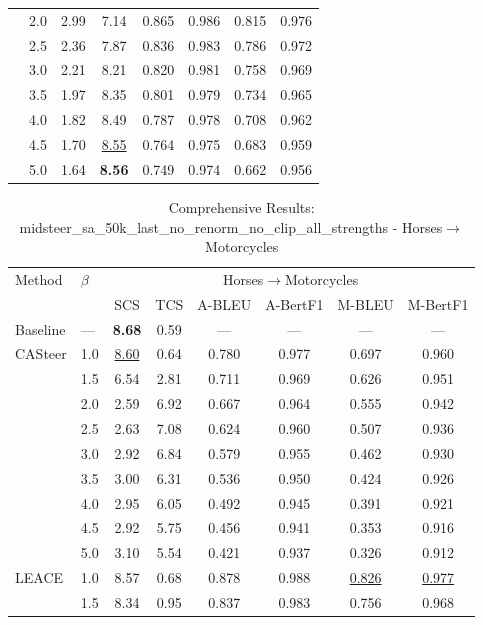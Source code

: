 \begin{table}[htbp]
\begin{tabular}{l|l|cccccc|}
 & 2.0 & 2.99 & 7.14 & 0.865 & 0.986 & 0.815 & 0.976 \\
 & 2.5 & 2.36 & 7.87 & 0.836 & 0.983 & 0.786 & 0.972 \\
 & 3.0 & 2.21 & 8.21 & 0.820 & 0.981 & 0.758 & 0.969 \\
 & 3.5 & 1.97 & 8.35 & 0.801 & 0.979 & 0.734 & 0.965 \\
 & 4.0 & 1.82 & 8.49 & 0.787 & 0.978 & 0.708 & 0.962 \\
 & 4.5 & 1.70 & \underline{8.55} & 0.764 & 0.975 & 0.683 & 0.959 \\
 & 5.0 & 1.64 & \textbf{8.56} & 0.749 & 0.974 & 0.662 & 0.956 \\
\hline
\end{tabular}
\end{table}

\begin{table}[htbp]
\centering
\caption{Comprehensive Results: midsteer\_sa\_50k\_last\_no\_renorm\_no\_clip\_all\_strengths - Horses$\rightarrow$Motorcycles}
\label{tab:midsteersa50klastnorenormnoclipallstrengths_horsestomotorcycles}
\begin{tabular}{l|l|cccccc|}
\hline
Method & $\beta$ & \multicolumn{6}{c|}{Horses$\rightarrow$Motorcycles} \\
 &  & SCS & TCS & A-BLEU & A-BertF1 & M-BLEU & M-BertF1 \\
\hline
Baseline & — & \textbf{8.68} & 0.59 & — & — & — & — \\
\hline
CASteer & 1.0 & \underline{8.60} & 0.64 & 0.780 & 0.977 & 0.697 & 0.960 \\
 & 1.5 & 6.54 & 2.81 & 0.711 & 0.969 & 0.626 & 0.951 \\
 & 2.0 & 2.59 & 6.92 & 0.667 & 0.964 & 0.555 & 0.942 \\
 & 2.5 & 2.63 & 7.08 & 0.624 & 0.960 & 0.507 & 0.936 \\
 & 3.0 & 2.92 & 6.84 & 0.579 & 0.955 & 0.462 & 0.930 \\
 & 3.5 & 3.00 & 6.31 & 0.536 & 0.950 & 0.424 & 0.926 \\
 & 4.0 & 2.95 & 6.05 & 0.492 & 0.945 & 0.391 & 0.921 \\
 & 4.5 & 2.92 & 5.75 & 0.456 & 0.941 & 0.353 & 0.916 \\
 & 5.0 & 3.10 & 5.54 & 0.421 & 0.937 & 0.326 & 0.912 \\
\hline
LEACE & 1.0 & 8.57 & 0.68 & 0.878 & 0.988 & \underline{0.826} & \underline{0.977} \\
 & 1.5 & 8.34 & 0.95 & 0.837 & 0.983 & 0.756 & 0.968 \\

\end{tabular}
\end{table}
